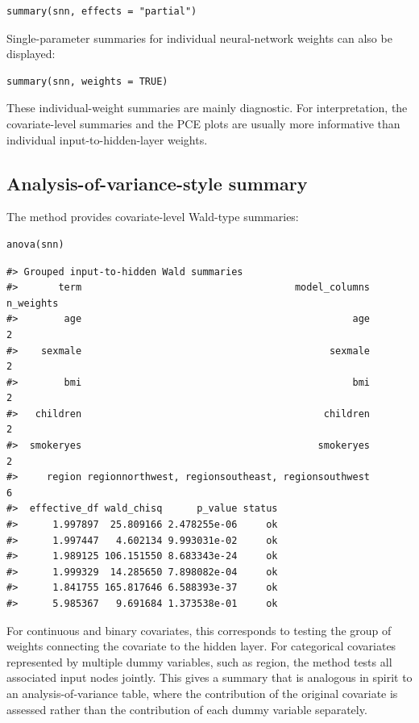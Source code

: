 \begin{verbatim}
summary(snn, effects = "partial")
\end{verbatim}

Single-parameter summaries for individual neural-network weights can also be displayed:

\begin{verbatim}
summary(snn, weights = TRUE)
\end{verbatim}

These individual-weight summaries are mainly diagnostic.
For interpretation, the covariate-level summaries and the PCE plots are usually more informative than individual input-to-hidden-layer weights.

\subsection{Analysis-of-variance-style summary}\label{analysis-of-variance-style-summary}

The  method provides covariate-level Wald-type summaries:

\begin{verbatim}
anova(snn)
\end{verbatim}

\begin{verbatim}
#> Grouped input-to-hidden Wald summaries
#>       term                                     model_columns n_weights
#>        age                                               age         2
#>    sexmale                                           sexmale         2
#>        bmi                                               bmi         2
#>   children                                          children         2
#>  smokeryes                                         smokeryes         2
#>     region regionnorthwest, regionsoutheast, regionsouthwest         6
#>  effective_df wald_chisq      p_value status
#>      1.997897  25.809166 2.478255e-06     ok
#>      1.997447   4.602134 9.993031e-02     ok
#>      1.989125 106.151550 8.683343e-24     ok
#>      1.999329  14.285650 7.898082e-04     ok
#>      1.841755 165.817646 6.588393e-37     ok
#>      5.985367   9.691684 1.373538e-01     ok
\end{verbatim}

For continuous and binary covariates, this corresponds to testing the group of weights connecting the covariate to the hidden layer.
For categorical covariates represented by multiple dummy variables, such as region, the method tests all associated input nodes jointly.
This gives a summary that is analogous in spirit to an analysis-of-variance table, where the contribution of the original covariate is assessed rather than the contribution of each dummy variable separately.

